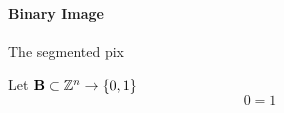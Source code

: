 \paragraph{Binary Image}
The segmented pix
\begin{sBox}
	Let $\mat{B} \subset \mathbb{Z}^n \rightarrow \{0, 1\}$
	\begin{equation}
		0=1		
	\end{equation}
\end{sBox}